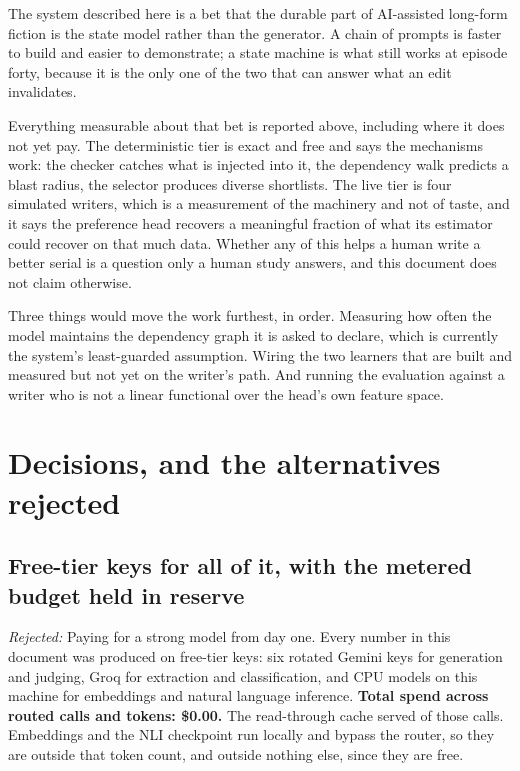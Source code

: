 \documentclass{article}
\newcommand{\decision}[1]{\subsection{#1}}
\newcommand{\rejected}[1]{\textit{Rejected:} #1}
\begin{document}
The system described here is a bet that the durable part of AI-assisted long-form fiction is
the state model rather than the generator. A chain of prompts is faster to build and easier
to demonstrate; a state machine is what still works at episode forty, because it is the only
one of the two that can answer what an edit invalidates.

Everything measurable about that bet is reported above, including where it does not yet pay.
The deterministic tier is exact and free and says the mechanisms work: the checker catches
what is injected into it, the dependency walk predicts a blast radius, the selector produces
diverse shortlists. The live tier is four simulated writers, which is a measurement of the
machinery and not of taste, and it says the preference head recovers a meaningful fraction
of what its estimator could recover on that much data. Whether any of this helps a human
write a better serial is a question only a human study answers, and this document does not
claim otherwise.

Three things would move the work furthest, in order. Measuring how often the model maintains
the dependency graph it is asked to declare, which is currently the system's least-guarded
assumption. Wiring the two learners that are built and measured but not yet on the writer's
path. And running the evaluation against a writer who is not a linear functional over the
head's own feature space.




\appendix

\section{Decisions, and the alternatives rejected}
\label{app:decisions}

\decision{Free-tier keys for all of it, with the metered budget held in reserve}
\rejected{Paying for a strong model from day one.} Every number in this document was
produced on free-tier keys: six rotated Gemini keys for generation and judging, Groq for
extraction and classification, and CPU models on this machine for embeddings and natural
language inference. \textbf{Total spend across \rProviderCalls{} routed calls and
\rProviderTokens{} tokens: \$0.00.} The read-through cache served \rProviderCacheHitRate{}
of those calls. Embeddings and the NLI checkpoint run locally and bypass the router, so they
are outside that token count, and outside nothing else, since they are free.
\end{document}
